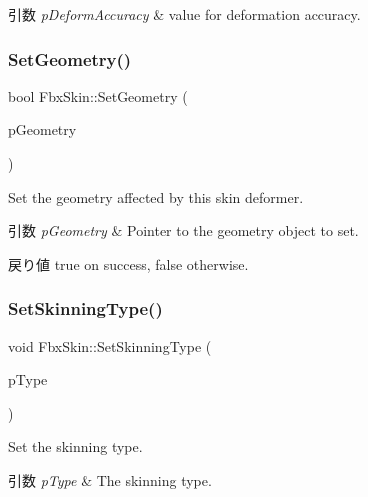 \begin{DoxyParams}{引数}
{\em p\+Deform\+Accuracy} & value for deformation accuracy. \\
\hline
\end{DoxyParams}
\mbox{\label{class_fbx_skin_a975c3ebb7a979bd28c7d9c9c236c09ee}} 
\subsubsection{\texorpdfstring{Set\+Geometry()}{SetGeometry()}}
{\footnotesize\ttfamily bool Fbx\+Skin\+::\+Set\+Geometry (\begin{DoxyParamCaption}\item[{\hyperlink{class_fbx_geometry}{Fbx\+Geometry} $\ast$}]{p\+Geometry }\end{DoxyParamCaption})}

Set the geometry affected by this skin deformer. 
\begin{DoxyParams}{引数}
{\em p\+Geometry} & Pointer to the geometry object to set. \\
\hline
\end{DoxyParams}
\begin{DoxyReturn}{戻り値}
{\ttfamily true} on success, {\ttfamily false} otherwise. 
\end{DoxyReturn}
\mbox{\label{class_fbx_skin_afb0eae9feba38a19266fd0d20f84fd40}} 
\subsubsection{\texorpdfstring{Set\+Skinning\+Type()}{SetSkinningType()}}
{\footnotesize\ttfamily void Fbx\+Skin\+::\+Set\+Skinning\+Type (\begin{DoxyParamCaption}\item[{\hyperlink{class_fbx_skin_aee398789ebed22fa97269a26c6049a16}{E\+Type}}]{p\+Type }\end{DoxyParamCaption})}

Set the skinning type. 
\begin{DoxyParams}{引数}
{\em p\+Type} & The skinning type. \\
\hline
\end{DoxyParams}


